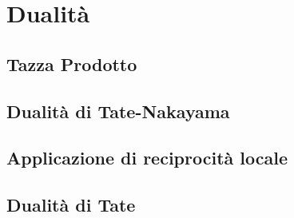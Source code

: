 \chapter{Dualità}

\section{Tazza Prodotto}

\section{Dualità di Tate-Nakayama}

\section{Applicazione di reciprocità locale}

\section{Dualità di Tate}